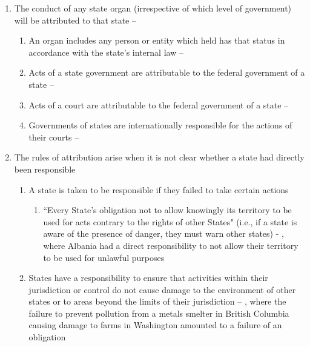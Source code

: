 \begin{enumerate}
\begin{enumerate}
        \item The conduct of any state organ (irrespective of which level of government) will be attributed to that state -- 
        \begin{enumerate}
            \item An organ includes any person or entity which held has that status in accordance with the state's internal law -- 
            \item Acts of a state government are attributable to the federal government of a state -- 
            \item Acts of a court are attributable to the federal government of a state -- 
            \item Governments of states are internationally responsible for the actions of their courts -- 
        \end{enumerate}
        \item The rules of attribution arise when it is not clear whether a state had directly been responsible
        \begin{enumerate}
            \item A state is taken to be responsible if they failed to take certain actions
            \begin{enumerate}
                \item ``Every State's obligation not to allow knowingly its territory to be used for acts contrary to the rights of other States" (i.e., if a state is aware of the presence of danger, they must warn other states) - , where Albania had a direct responsibility to not allow their territory to be used for unlawful purposes
            \end{enumerate}
            \item States have a responsibility to ensure that activities within their jurisdiction or control do not cause damage to the environment of other states or to areas beyond the limits of their jurisdiction -- , where the failure to prevent pollution from a metals smelter in British Columbia causing damage to farms in Washington amounted to a failure of an obligation

\end{enumerate}
\end{enumerate}
\end{enumerate}

